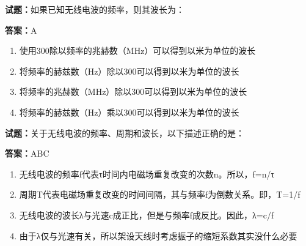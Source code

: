\documentclass{ctexbook}
\begin{document}




\vspace{1em}

\textbf{试题：}如果已知无线电波的频率，则其波长为： 

\textbf{答案：}A 

\begin{enumerate}[leftmargin=3em]
  \item 使用300除以频率的兆赫数（MHz）可以得到以米为单位的波长 

  \item 将频率的赫兹数（Hz）除以300可以得到以米为单位的波长 

  \item 将频率的兆赫数（MHz）除以300可以得到以米为单位的波长 

  \item 将频率的赫兹数（Hz）乘以300可以得到以米为单位的波长 

\end{enumerate}





\vspace{1em}

\textbf{试题：}关于无线电波的频率、周期和波长，以下描述正确的是： 


\textbf{答案：}ABC 

\begin{enumerate}[leftmargin=3em]
  \item 无线电波的频率f代表τ时间内电磁场重复改变的次数n。所以，f=n/τ 

  \item 周期T代表电磁场重复改变的时间间隔，其与频率f为倒数关系。即，T=1/f 

  \item 无线电波的波长λ与光速c成正比，但是与频率f成反比。因此，λ=c/f 

  \item 由于λ仅与光速有关，所以架设天线时考虑振子的缩短系数其实没什么必要 

\end{enumerate}





\vspace{1em}
\end{document}
